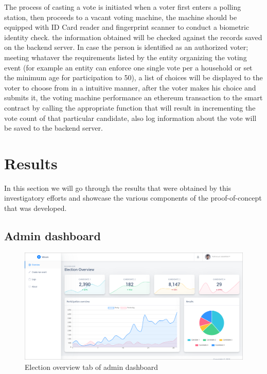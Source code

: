The process of casting a vote is initiated when a voter first enters a polling station, then proceeds to a vacant voting machine, the machine should be equipped with ID Card reader and fingerprint scanner to conduct a biometric identity check. the information obtained will be checked against the records saved on the backend server. In case the person is identified as an authorized voter; meeting whataver the requirements listed by the entity organizing the voting event (for example an entity can enforce one single vote per a household or set the minimum age for participation to 50), a list of choices will be displayed to the voter to choose from in a intuitive manner, after the voter makes his choice and submits it, the voting machine performance an ethereum transaction to the smart contract by calling the appropriate function that will result in incrementing the vote count of that particular candidate, also log information about the vote will be saved to the backend server.

\section{Results}

In this section we will go through the results that were obtained by this investigatory efforts and showcase the various components of the proof-of-concept that was developed.

\subsection{Admin dashboard}

\begin{figure}[H]
	\centering
		\includegraphics[width=14cm]{images/chapter3/admin_1.png}
		\caption{{\footnotesize Election overview tab of admin dashboard}}
\end{figure}

